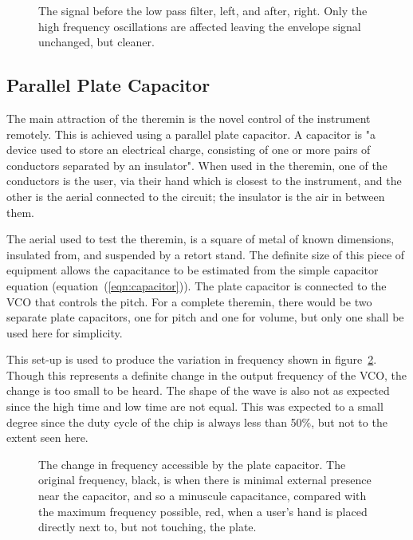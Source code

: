 \begin{figure}[htbp]
	\centering
		 
		\vspace{-10pt}
		\caption{The signal before the low pass filter, left, and after, right. Only the high frequency oscillations are affected leaving the envelope signal unchanged, but cleaner.}
		\label{fig:filter before after}
\end{figure}

\subsection{Parallel Plate Capacitor}
\label{sec:PPCapacitor}
The main attraction of the theremin is the novel control of the instrument remotely. This is achieved using a parallel plate capacitor. A capacitor is "a device used to store an electrical charge, consisting of one or more pairs of conductors separated by an insulator"\cite{OED2000}. When used in the theremin, one of the conductors is the user, via their hand which is closest to the instrument, and the other is the aerial connected to the circuit; the insulator is the air in between them. 

The aerial used to test the theremin, is a square of metal of known dimensions, insulated from, and suspended by a retort stand. The definite size of this piece of equipment allows the capacitance to be estimated from the simple capacitor equation (equation~(\ref{eqn:capacitor})). The plate capacitor is connected to the VCO that controls the pitch. For a complete theremin, there would be two separate plate capacitors, one for pitch and one for volume, but only one shall be used here for simplicity.

This set-up is used to produce the variation in frequency shown in figure~\ref{fig:capacitor high low}. Though this represents a definite change in the output frequency of the VCO, the change is too small to be heard. The shape of the wave is also not as expected since the high time and low time are not equal. This was expected to a small degree since the duty cycle of the chip is always less than 50\%, but not to the extent seen here.

\begin{figure}[htbp]
	\centering
		 
		\caption{The change in frequency accessible by the plate capacitor. The original frequency, black, is when there is minimal external presence near the capacitor, and so a minuscule capacitance, compared with the maximum frequency possible, red, when a user's hand is placed directly next to, but not touching, the plate.}
		\label{fig:capacitor high low}
\end{figure}

